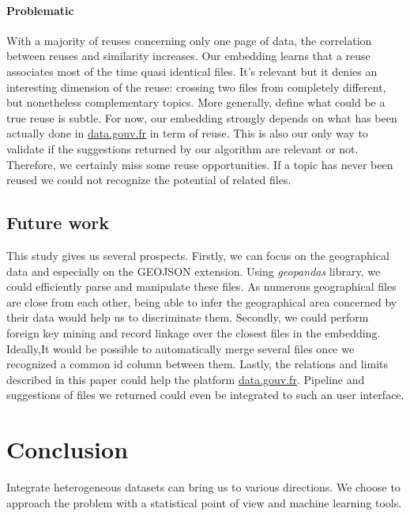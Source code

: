 \documentclass[a4paper]{article}
\begin{document}
	\paragraph{Problematic}
	
	With a majority of reuses concerning only one page of data, the correlation between reuses and similarity increases. Our embedding learns that a reuse associates most of the time quasi identical files. It's relevant but it denies an interesting dimension of the reuse: crossing two files from completely different, but nonetheless complementary topics. More generally, define what could be a true reuse is subtle. For now, our embedding strongly depends on what has been actually done in \href{http://www.data.gouv.fr/fr/}{data.gouv.fr} in term of reuse. This is also our only way to validate if the suggestions returned by our algorithm are relevant or not. Therefore, we certainly miss some reuse opportunities. If a topic has never been reused we could not recognize the potential of related files.
	
	\subsection{Future work}
	
	This study gives us several prospects. Firstly, we can focus on the geographical data and especially on the GEOJSON extension. Using \emph{geopandas} library, we could efficiently parse and manipulate these files. As numerous geographical files are close from each other, being able to infer the geographical area concerned by their data would help us to discriminate them. Secondly, we could perform foreign key mining and record linkage over the closest files in the embedding. Ideally,It would be possible to automatically merge several files once we recognized a common id column between them. Lastly, the relations and limits described in this paper could help the platform \href{http://www.data.gouv.fr/fr/}{data.gouv.fr}. Pipeline and suggestions of files we returned could even be integrated to such an user interface. 

	\section{Conclusion}	
	
	Integrate heterogeneous datasets can bring us to various directions. We choose to approach the problem with a statistical point of view and machine learning tools. 
	
\end{document}
